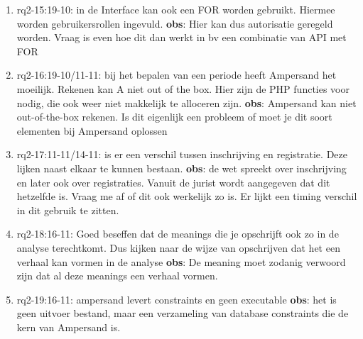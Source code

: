 \begin{enumerate}
    \item rq2-15:19-10: in de Interface kan ook een FOR worden gebruikt. Hiermee worden gebruikersrollen ingevuld.
    \newline\textbf{obs}: Hier kan dus autorisatie geregeld worden. Vraag is even hoe dit dan werkt in bv een combinatie van API met FOR
    
    \item rq2-16:19-10/11-11: bij het bepalen van een periode heeft Ampersand het moeilijk. Rekenen kan A niet out of the box. Hier zijn de PHP functies voor nodig, die ook weer niet makkelijk te alloceren zijn.
    \newline\textbf{obs}: Ampersand kan niet out-of-the-box rekenen. 
    Is dit eigenlijk een probleem of moet je dit soort elementen bij Ampersand oplossen
    
    \item rq2-17:11-11/14-11: is er een verschil tussen inschrijving en registratie. Deze lijken naast elkaar te kunnen bestaan.
    \newline\textbf{obs}: de wet spreekt over inschrijving en later ook over registraties. 
    Vanuit de jurist wordt aangegeven dat dit hetzelfde is.
    Vraag me af of dit ook werkelijk zo is. 
    Er lijkt een timing verschil in dit gebruik te zitten.
    
    \item rq2-18:16-11: Goed beseffen dat de meanings die je opschrijft ook zo in de analyse terechtkomt. Dus kijken naar de wijze van opschrijven dat het een verhaal kan vormen in de analyse
    \newline\textbf{obs}: De meaning moet zodanig verwoord zijn dat al deze meanings een verhaal vormen.
    
    \item rq2-19:16-11: ampersand levert constraints en geen executable
    \newline\textbf{obs}: het is geen uitvoer bestand, maar een verzameling van database constraints die de kern van Ampersand is.
    
\end{enumerate}
